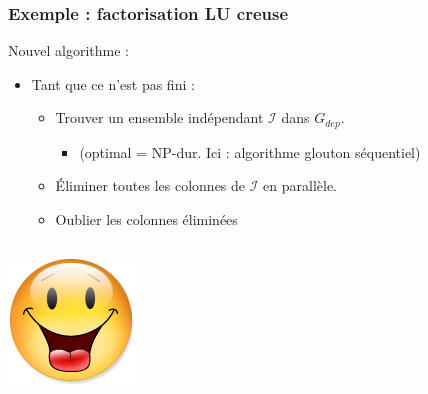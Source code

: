 \documentclass[xcolor={x11names,svgnames}]{beamer}
\begin{document}

\begin{frame}[label=sparse_lu_MIS]
  \frametitle{Exemple : factorisation LU creuse}

  \begin{block}{Nouvel algorithme :}
  \begin{itemize}
  \item Tant que ce n'est pas fini :
    \begin{itemize}
    \item Trouver un ensemble indépendant $\mathcal{I}$ dans $G_{dep}$.
      \begin{itemize}
      \item (optimal = NP-dur. Ici : algorithme glouton séquentiel)
      \end{itemize}
    \item Éliminer toutes les colonnes de $\mathcal{I}$ \alert{en parallèle}.
    \item \og Oublier\fg{} les colonnes éliminées
    \end{itemize}
  \end{itemize}
\end{block}

\bigskip

    \begin{columns}[c]
    \begin{column}{.1\textwidth}
      \includegraphics[width=\textwidth]{Content.png}
    \end{column}
    \begin{column}[c]{.9\textwidth}


\end{column}
\end{columns}
\end{frame}
\end{document}
